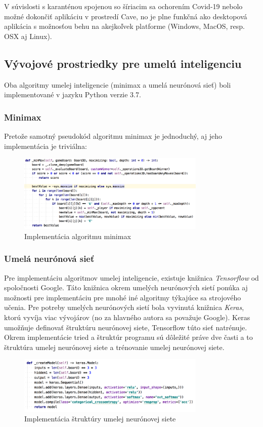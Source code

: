 V súvislosti s karanténou spojenou so šíriacim sa ochorením Covid-19 nebolo možné dokončiť aplikáciu v prostredí Cave,
no je plne funkčná ako desktopová aplikácia s možnosťou behu na akejkoľvek platforme (Windows, MacOS, resp. OSX aj
Linux).

\subsection{Vývojové prostriedky pre umelú inteligenciu}\label{subsec:dev-tools-for-ai}

Oba algoritmy umelej inteligencie (minimax a umelá neurónová sieť) boli implementované v jazyku Python verzie 3.7.

\subsubsection{Minimax}

Pretože samotný pseudokód algoritmu minimax je jednoduchý, aj jeho implementácia je triviálna:
\begin{figure}[H]
    \centering
    \includegraphics[width=0.8\textwidth]{images/impl-minimax.jpg}
    \caption{Implementácia algoritmu minimax}
\end{figure}\label{figure:minimax-impl}

\subsubsection{Umelá neurónová sieť}

Pre implementáciu algoritmov umelej inteligencie, existuje knižnica \emph{Tensorflow}\cite{tensorflow} od spoločnosti
Google.
Táto knižnica okrem umelých neurónových sietí ponúka aj možnosti pre implementáciu pre mnohé iné algoritmy týkajúce sa
strojového učenia.
Pre potreby umelých neurónových sietí bola vyvinutá knižnica \emph{Keras}\cite{keras}, ktorú vyvíja viac vývojárov
(no za hlavného autora sa považuje Google).
Keras umožňuje definovať štruktúru neurónovej siete, Tensorflow túto sieť natrénuje.
Okrem implementácie tried a štruktúr programu sú dôležité práve dve časti a to štruktúra umelej neurónovej siete a
trénovanie umelej neurónovej siete.
\begin{figure}[H]
    \centering
    \includegraphics[width=0.8\textwidth]{images/impl-ann-model.jpg}
    \caption{Implementácia štruktúry umelej neurónovej siete}
\end{figure}\label{figure:ann-model-impl}

